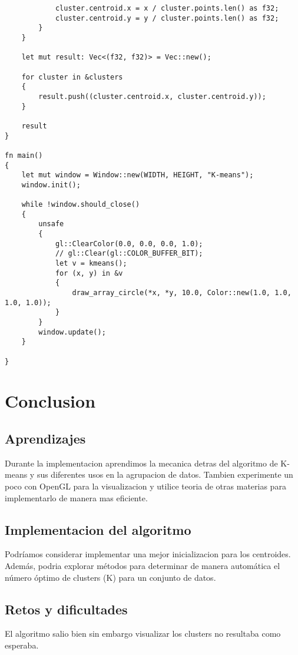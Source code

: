 \documentclass{article}
\begin{document}
\begin{verbatim}
            cluster.centroid.x = x / cluster.points.len() as f32;
            cluster.centroid.y = y / cluster.points.len() as f32;
        }
    }

    let mut result: Vec<(f32, f32)> = Vec::new();

    for cluster in &clusters
    {
        result.push((cluster.centroid.x, cluster.centroid.y));
    }

    result
}

fn main()
{
    let mut window = Window::new(WIDTH, HEIGHT, "K-means");
    window.init();

    while !window.should_close()
    {
        unsafe
        {
            gl::ClearColor(0.0, 0.0, 0.0, 1.0);
            // gl::Clear(gl::COLOR_BUFFER_BIT);
            let v = kmeans();
            for (x, y) in &v
            {
                draw_array_circle(*x, *y, 10.0, Color::new(1.0, 1.0, 1.0, 1.0));
            }
        }
        window.update();
    }

}
\end{verbatim}

\section{Conclusion}
\subsection{Aprendizajes}
Durante la implementacion aprendimos la mecanica detras del algoritmo de K-means y sus
diferentes usos en la agrupacion de datos. Tambien experimente un poco con OpenGL para la
visualizacion y utilice teoria de otras materias para implementarlo de manera mas eficiente.
\subsection{Implementacion del algoritmo}
Podríamos considerar implementar una mejor inicializacion para los centroides. Además,
podria explorar métodos para determinar de manera automática el número óptimo de clusters (K) para
un conjunto de datos.
\subsection{Retos y dificultades}
El algoritmo salio bien sin embargo visualizar los clusters no resultaba como esperaba.
\end{document}

